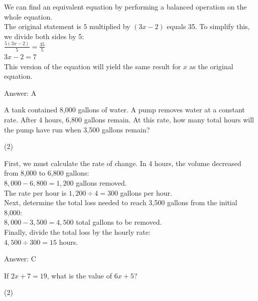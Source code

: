 \documentclass[11pt,paper=a4,answers]{exam}
\begin{document}
\begin{questions}
\begin{solution}
We can find an equivalent equation by performing a balanced operation on the whole equation. 
\\[10pt]
The original statement is $5$ multiplied by $(3x - 2)$ equals 35. To simplify this, we divide both sides by 5:
\\[10pt]
$\frac{5(3x - 2)}{5} = \frac{35}{5}$ \\
$3x - 2 = 7$ 
\\[10pt]
This version of the equation will yield the same result for $x$ as the original equation.

\vspace{20pt}
Answer: \colorbox{yellow!100}{A}
\end{solution}

\question
A tank contained 8,000 gallons of water. A pump removes water at a constant rate. After 4 hours, 6,800 gallons remain. At this rate, how many total hours will the pump have run when 3,500 gallons remain?
\begin{tasks}(2)
\end{tasks}

\begin{solution}
First, we must calculate the rate of change. In 4 hours, the volume decreased from 8,000 to 6,800 gallons:
\\[10pt]
$8,000 - 6,800 = 1,200$ gallons removed. 
\\[10pt]
The rate per hour is $1,200 \div 4 = 300$ gallons per hour. 
\\[10pt]
Next, determine the total loss needed to reach 3,500 gallons from the initial 8,000:
\\[10pt]
$8,000 - 3,500 = 4,500$ total gallons to be removed. 
\\[10pt]
Finally, divide the total loss by the hourly rate:
\\[10pt]
$4,500 \div 300 = 15$ hours.

\vspace{20pt}
Answer: \colorbox{yellow!100}{C}
\end{solution}

\question
If $2x + 7 = 19$, what is the value of $6x + 5$?
\begin{tasks}(2)
\end{tasks}


\end{questions}
\end{document}
